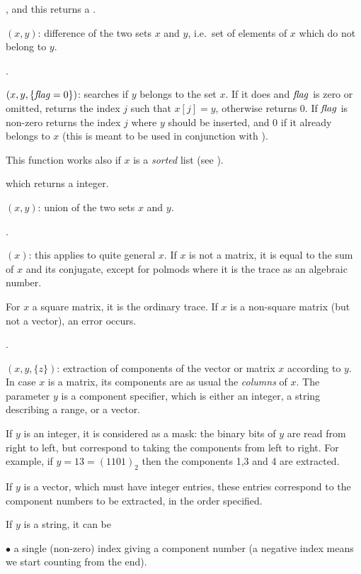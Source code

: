 , and this returns a .

$(x,y)$: difference of the two sets $x$ and $y$,
i.e.~set of elements of $x$ which do not belong to $y$.

.

$(x,y,\{\hbox{\it f\kern0pt lag\/}=0\})$: searches if $y$ belongs to the set
$x$. If it does and $\hbox{\it f\kern0pt lag\/}$ is zero or omitted, returns the index $j$ such that
$x[j]=y$, otherwise returns 0. If $\hbox{\it f\kern0pt lag\/}$ is non-zero returns the index $j$
where $y$ should be inserted, and $0$ if it already belongs to $x$ (this is
meant to be used in conjunction with ).

This function works also if $x$ is a \emph{sorted} list (see ).

 which returns a 
integer.

$(x,y)$: union of the two sets $x$ and $y$.

.

$(x)$: this applies to quite general $x$. If $x$ is not a
matrix, it is equal to the sum of $x$ and its conjugate, except for polmods
where it is the trace as an algebraic number.

For $x$ a square matrix, it is the ordinary trace. If $x$ is a
non-square matrix (but not a vector), an error occurs.

.

$(x,y,\{z\})$: extraction of components of the
vector or matrix $x$ according to $y$. In case $x$ is a matrix, its
components are as usual the \emph{columns} of $x$. The parameter $y$ is a
component specifier, which is either an integer, a string describing a
range, or a vector.

If $y$ is an integer, it is considered as a mask: the binary bits of $y$ are
read from right to left, but correspond to taking the components from left to
right. For example, if $y=13=(1101)_2$ then the components 1,3 and 4 are
extracted.

If $y$ is a vector, which must have integer entries, these entries correspond
to the component numbers to be extracted, in the order specified.

If $y$ is a string, it can be

$\bullet$ a single (non-zero) index giving a component number (a negative
index means we start counting from the end).

